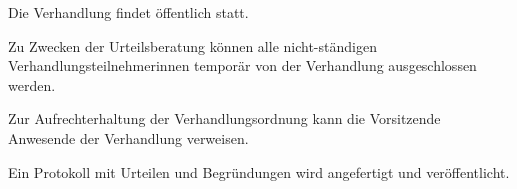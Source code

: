 \documentclass{sasbase}
\begin{document}
\begin{article}[Verhandlung]
    \item Die Verhandlung findet öffentlich statt.
    \item Zu Zwecken der Urteilsberatung können alle nicht-ständigen Verhandlungsteilnehmerinnen
        temporär von der Verhandlung ausgeschlossen werden.
    \item Zur Aufrechterhaltung der Verhandlungsordnung kann die Vorsitzende Anwesende der
        Verhandlung verweisen.
    \item Ein Protokoll mit Urteilen und Begründungen wird angefertigt und veröffentlicht.
\end{article}
\end{document}
